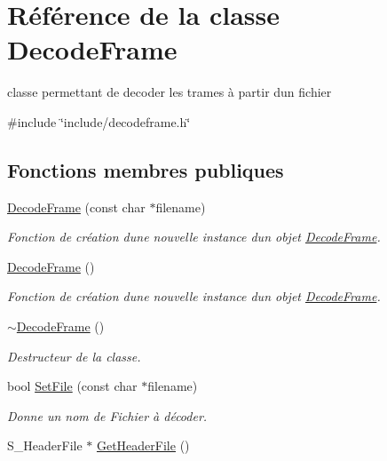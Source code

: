 \hypertarget{class_decode_frame}{}\section{Référence de la classe Decode\+Frame}
\label{class_decode_frame}


classe permettant de decoder les trames à partir d\textquotesingle{}un fichier  




{\ttfamily \#include \char`\"{}include/decodeframe.\+h\char`\"{}}

\subsection*{Fonctions membres publiques}
\begin{DoxyCompactItemize}
\item 
\hyperlink{class_decode_frame_ad55f7834381bfcdbe5796d11febfe3f0}{Decode\+Frame} (const char $\ast$filename)
\begin{DoxyCompactList}\small\item\em Fonction de création d\textquotesingle{}une nouvelle instance d\textquotesingle{}un objet \hyperlink{class_decode_frame}{Decode\+Frame}. \end{DoxyCompactList}\item 
\hyperlink{class_decode_frame_ae6ae88ee29bcaff936e7c7b2380f96b4}{Decode\+Frame} ()
\begin{DoxyCompactList}\small\item\em Fonction de création d\textquotesingle{}une nouvelle instance d\textquotesingle{}un objet \hyperlink{class_decode_frame}{Decode\+Frame}. \end{DoxyCompactList}\item 
\hyperlink{class_decode_frame_a150abde40a177b9b585c75d562516f2a}{$\sim$\+Decode\+Frame} ()
\begin{DoxyCompactList}\small\item\em Destructeur de la classe. \end{DoxyCompactList}\item 
bool \hyperlink{class_decode_frame_a61d74f8bd0886b27356a4431999049ae}{Set\+File} (const char $\ast$filename)
\begin{DoxyCompactList}\small\item\em Donne un nom de Fichier à décoder. \end{DoxyCompactList}\item 
S\+\_\+\+Header\+File $\ast$ \hyperlink{class_decode_frame_ae77129fbf6e42f2260db3d215a954026}{Get\+Header\+File} ()

\end{DoxyCompactItemize}
